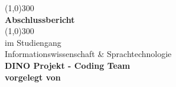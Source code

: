	\begin{titlepage}

		\begin{center}
		\line(1,0){300} \\
		[2mm]
		\huge{\bfseries Abschlussbericht} \\
		\line(1,0){300} \\
		[1cm]

		\large{im Studiengang \\ Informationswissenschaft \& Sprachtechnologie} \\
		[1cm]
		\LARGE{\textbf{DINO Projekt - Coding Team}} \\
		[1.5cm]

		\large{\textbf {vorgelegt von}}\\ 

	\end{center}
	
	
\end{titlepage}
